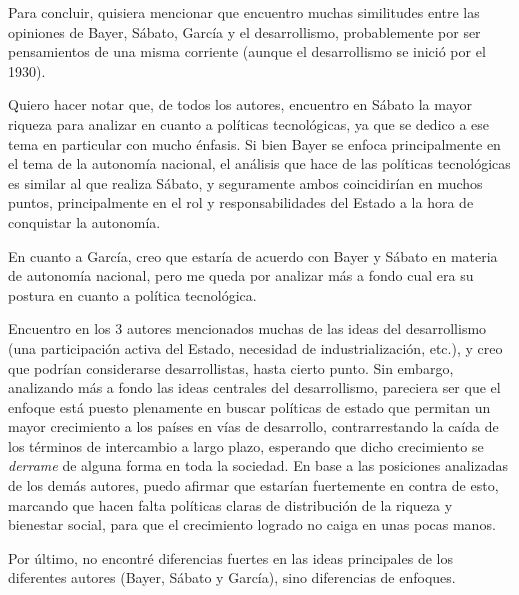 Para concluir, quisiera mencionar que encuentro muchas similitudes entre las opiniones de Bayer, Sábato, García y el desarrollismo,
probablemente por ser pensamientos de una misma corriente (aunque el desarrollismo se inició por el 1930).

Quiero hacer notar que, de todos los autores, encuentro en Sábato la mayor riqueza para analizar en cuanto a políticas tecnológicas, ya que se dedico a ese tema en particular con mucho énfasis. Si bien Bayer se enfoca principalmente en el tema de la autonomía nacional, el análisis que hace de las políticas tecnológicas es similar al que realiza Sábato, y seguramente ambos coincidirían en muchos puntos, principalmente en el rol y responsabilidades del Estado a la hora de conquistar la autonomía.

En cuanto a García, creo que estaría de acuerdo con Bayer y Sábato en materia de autonomía nacional, pero me queda por analizar más a fondo cual era su postura en cuanto a política tecnológica.

Encuentro en los 3 autores mencionados muchas de las ideas del desarrollismo (una participación activa del Estado, necesidad de industrialización, etc.), y creo que podrían considerarse desarrollistas, hasta cierto punto.
Sin embargo, analizando más a fondo las ideas centrales del desarrollismo, pareciera ser que el enfoque está puesto plenamente en buscar políticas de estado que permitan un mayor crecimiento a los países en vías de desarrollo, contrarrestando la caída de los términos de intercambio a largo plazo, esperando que dicho crecimiento se \textit{derrame} de alguna forma en toda la sociedad. En base a las posiciones analizadas de los demás autores, puedo afirmar que estarían fuertemente en contra de esto, marcando que hacen falta políticas claras de distribución de la riqueza y bienestar social, para que el crecimiento logrado no caiga en unas pocas manos.

Por último, no encontré diferencias fuertes en las ideas principales de los diferentes autores (Bayer, Sábato y García), sino diferencias de enfoques.
